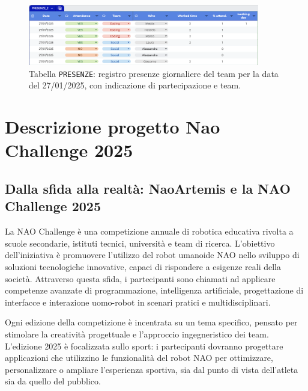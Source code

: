 \documentclass{optica-article}
\begin{document}
\begin{abstract*}
\begin{figure}[H]
    \centering
    \includegraphics[width=0.9\textwidth]{figures/file_presenze.png}
    \caption{Tabella \texttt{PRESENZE}: registro presenze giornaliere del team per la data del 27/01/2025, con indicazione di partecipazione e team.}
    \label{fig:presenze}
\end{figure}

\bigskip

\noindent

\end{abstract*}


\section{Descrizione progetto Nao Challenge 2025}

\subsection{Dalla sfida alla realt\`a: NaoArtemis e la NAO Challenge 2025}
La NAO Challenge \`e una competizione annuale di robotica educativa rivolta a scuole secondarie, istituti tecnici, universit\`a e team di ricerca. L'obiettivo dell'iniziativa \`e promuovere l'utilizzo del robot umanoide NAO nello sviluppo di soluzioni tecnologiche innovative, capaci di rispondere a esigenze reali della societ\`a. Attraverso questa sfida, i partecipanti sono chiamati ad applicare competenze avanzate di programmazione, intelligenza artificiale, progettazione di interfacce e interazione uomo-robot in scenari pratici e multidisciplinari.

Ogni edizione della competizione \`e incentrata su un tema specifico, pensato per stimolare la creativit\`a progettuale e l'approccio ingegneristico dei team. L'edizione 2025 \`e focalizzata sullo sport: i partecipanti dovranno progettare applicazioni che utilizzino le funzionalit\`a del robot NAO per ottimizzare, personalizzare o ampliare l'esperienza sportiva, sia dal punto di vista dell'atleta sia da quello del pubblico.
\end{document}
